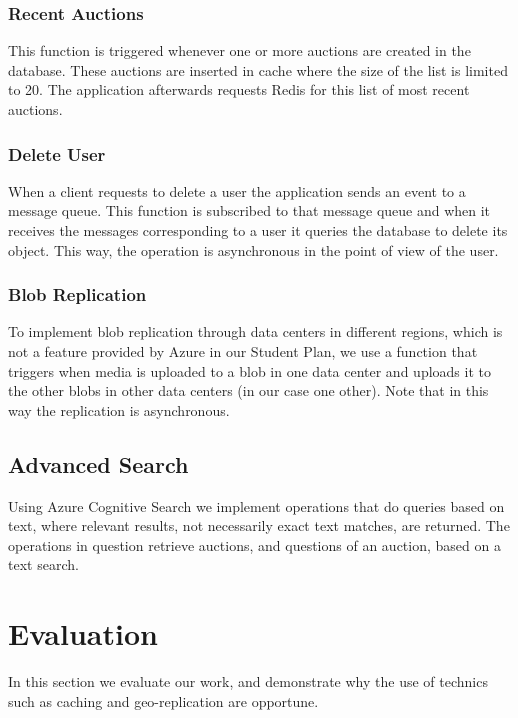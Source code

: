 \documentclass[runningheads]{llncs}
\begin{document}
\subsubsection{Recent Auctions}

This function is triggered whenever one or more auctions are created in the database. These auctions are inserted in cache where the size of the list is limited to 20. The application afterwards requests Redis for this list of most recent auctions.

\subsubsection{Delete User}

When a client requests to delete a user the application sends an event to a message queue. This function is subscribed to that message queue and when it receives the messages corresponding to a user it queries the database to delete its object. This way, the operation is asynchronous in the point of view of the user.

\subsubsection{Blob Replication}

To implement blob replication through data centers in different regions, which is not a feature provided by Azure in our Student Plan, we use a function that triggers when media is uploaded to a blob in one data center and uploads it to the other blobs in other data centers (in our case one other). Note that in this way the replication is asynchronous.

\subsection{Advanced Search}

Using Azure Cognitive Search we implement operations that do queries based on text, where relevant results, not necessarily exact text matches, are returned. The operations in question retrieve auctions, and questions of an auction, based on a text search.

\section{Evaluation}

In this section we evaluate our work, and demonstrate why the use of technics such as caching and geo-replication are opportune.
\end{document}
